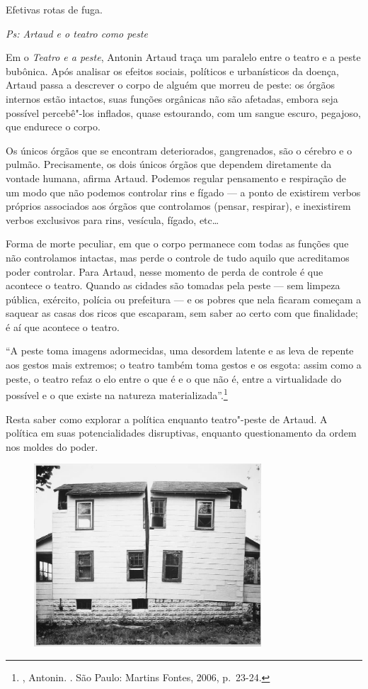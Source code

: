 Efetivas rotas de fuga.

\asterisc

\emph{Ps: Artaud e o teatro como peste}

Em o \emph{Teatro e a peste}, Antonin Artaud traça um paralelo entre o
teatro e a peste bubônica. Após analisar os efeitos sociais, políticos e
urbanísticos da doença, Artaud passa a descrever o corpo de alguém que
morreu de peste: os órgãos internos estão intactos, suas funções
orgânicas não são afetadas, embora seja possível percebê"-los inflados,
quase estourando, com um sangue escuro, pegajoso, que endurece o corpo.

Os únicos órgãos que se encontram deteriorados, gangrenados, são o
cérebro e o pulmão. Precisamente, os dois únicos órgãos que dependem
diretamente da vontade humana, afirma Artaud. Podemos regular
pensamento e respiração de um modo que não podemos controlar rins e
fígado --- a ponto de existirem verbos próprios associados aos órgãos que
controlamos (pensar, respirar), e inexistirem verbos exclusivos para
rins, vesícula, fígado, etc\ldots{}

Forma de morte peculiar, em que o corpo permanece com todas as funções
que não controlamos intactas, mas perde o controle de tudo aquilo que
acreditamos poder controlar. Para Artaud, nesse momento de perda de
controle é que acontece o teatro. Quando as cidades são tomadas pela
peste --- sem limpeza pública, exército, polícia ou prefeitura ---
e os pobres que nela ficaram começam a saquear as casas dos ricos que
escaparam, sem saber ao certo com que finalidade; é aí que acontece o
teatro.

``A peste toma imagens adormecidas, uma desordem latente e as leva de
repente aos gestos mais extremos; o teatro também toma gestos e os
esgota: assim como a peste, o teatro refaz o elo entre o que é e o que
não é, entre a virtualidade do possível e o que existe na natureza
materializada''.\footnote{, Antonin. {}.
  São Paulo: Martins Fontes, 2006, p.~23-24.}

Resta saber como explorar a política enquanto teatro"-peste de Artaud. A
política em suas potencialidades disruptivas, enquanto questionamento da
ordem nos moldes do poder.

\begin{figure}[!ht]
\centering
 \includegraphics[width=85mm]{./imgs/cuts.jpg}
\caption{\tiny{}}
\end{figure}

